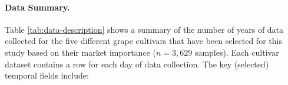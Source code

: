 \paragraph{Data Summary.} Table \ref{tab:data-description} shows a summary of the number of years of data collected for the five different grape cultivars that have been selected for this study based on their market importance ($n=3,629$ samples). 
Each cultivar dataset contains a row for each day of data collection. %
The key (selected) temporal fields include:
